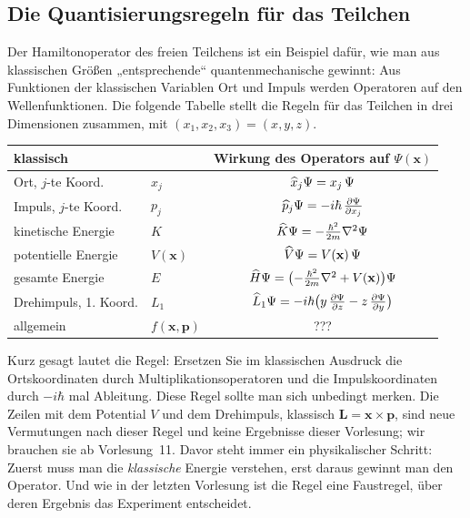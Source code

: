 \subsection{Die Quantisierungsregeln für das Teilchen}
Der Hamiltonoperator des freien Teilchens ist ein Beispiel dafür, wie man aus klassischen Größen „entsprechende“ quantenmechanische gewinnt: Aus Funktionen der klassischen Variablen Ort und Impuls werden Operatoren auf den Wellenfunktionen. Die folgende Tabelle stellt die Regeln für das Teilchen in drei Dimensionen zusammen, mit $(x_1,x_2,x_3) = (x,y,z)$.
\begin{center}
\small\begin{tabular}{@{}llc@{}}    \toprule
\textbf{klassisch} & & \textbf{Wirkung des Operators auf $\Psi(\mathbf{x})$}  \\\midrule
Ort, $j$-te Koord. & $x_j$ & $\widehat{x}_j\Psi = x_j\,\Psi$  \\
\rowcolor{isabelline} Impuls, $j$-te Koord. & $p_j$ & $\widehat{p}_j\Psi = -i\hbar\,\frac{\partial\Psi}{\partial x_j}$  \\
kinetische Energie & $K$ & $\widehat{K}\Psi = -\frac{\hbar^2}{2m}\nabla^2\Psi$ \\
\rowcolor{isabelline} potentielle Energie & $V(\mathbf{x})$ & $\widehat{V}\Psi = V(\mathbf{x})\,\Psi$ \\
gesamte Energie & $E$ & $\widehat{H}\Psi = \bigl(-\frac{\hbar^2}{2m}\nabla^2 + V(\mathbf{x})\bigr)\Psi$ \\
\rowcolor{isabelline} Drehimpuls, 1. Koord. & $L_1$ & $\widehat{L}_1\Psi = -i\hbar\bigl(y\,\frac{\partial\Psi}{\partial z} - z\,\frac{\partial\Psi}{\partial y}\bigr)$  \\
allgemein & $f(\mathbf{x},\mathbf{p})$ & ??? \\
\bottomrule
\end{tabular}
\end{center}

Kurz gesagt lautet die Regel: Ersetzen Sie im klassischen Ausdruck die Ortskoordinaten durch Multiplikationsoperatoren und die Impulskoordinaten durch $-i\hbar$ mal Ableitung. Diese Regel sollte man sich unbedingt merken. Die Zeilen mit dem Potential $V$ und dem Drehimpuls, klassisch $\mathbf{L} = \mathbf{x}\times\mathbf{p}$, sind neue Vermutungen nach dieser Regel und keine Ergebnisse dieser Vorlesung; wir brauchen sie ab Vorlesung~11. Davor steht immer ein physikalischer Schritt: Zuerst muss man die \emph{klassische} Energie verstehen, erst daraus gewinnt man den Operator. Und wie in der letzten Vorlesung ist die Regel eine Faustregel, über deren Ergebnis das Experiment entscheidet.

